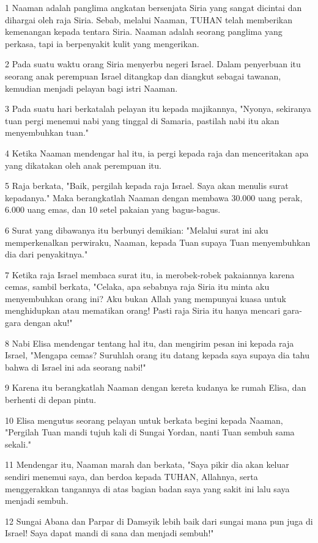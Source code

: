 \par 1 Naaman adalah panglima angkatan bersenjata Siria yang sangat dicintai dan dihargai oleh raja Siria. Sebab, melalui Naaman, TUHAN telah memberikan kemenangan kepada tentara Siria. Naaman adalah seorang panglima yang perkasa, tapi ia berpenyakit kulit yang mengerikan.
\par 2 Pada suatu waktu orang Siria menyerbu negeri Israel. Dalam penyerbuan itu seorang anak perempuan Israel ditangkap dan diangkut sebagai tawanan, kemudian menjadi pelayan bagi istri Naaman.
\par 3 Pada suatu hari berkatalah pelayan itu kepada majikannya, "Nyonya, sekiranya tuan pergi menemui nabi yang tinggal di Samaria, pastilah nabi itu akan menyembuhkan tuan."
\par 4 Ketika Naaman mendengar hal itu, ia pergi kepada raja dan menceritakan apa yang dikatakan oleh anak perempuan itu.
\par 5 Raja berkata, "Baik, pergilah kepada raja Israel. Saya akan menulis surat kepadanya." Maka berangkatlah Naaman dengan membawa 30.000 uang perak, 6.000 uang emas, dan 10 setel pakaian yang bagus-bagus.
\par 6 Surat yang dibawanya itu berbunyi demikian: "Melalui surat ini aku memperkenalkan perwiraku, Naaman, kepada Tuan supaya Tuan menyembuhkan dia dari penyakitnya."
\par 7 Ketika raja Israel membaca surat itu, ia merobek-robek pakaiannya karena cemas, sambil berkata, "Celaka, apa sebabnya raja Siria itu minta aku menyembuhkan orang ini? Aku bukan Allah yang mempunyai kuasa untuk menghidupkan atau mematikan orang! Pasti raja Siria itu hanya mencari gara-gara dengan aku!"
\par 8 Nabi Elisa mendengar tentang hal itu, dan mengirim pesan ini kepada raja Israel, "Mengapa cemas? Suruhlah orang itu datang kepada saya supaya dia tahu bahwa di Israel ini ada seorang nabi!"
\par 9 Karena itu berangkatlah Naaman dengan kereta kudanya ke rumah Elisa, dan berhenti di depan pintu.
\par 10 Elisa mengutus seorang pelayan untuk berkata begini kepada Naaman, "Pergilah Tuan mandi tujuh kali di Sungai Yordan, nanti Tuan sembuh sama sekali."
\par 11 Mendengar itu, Naaman marah dan berkata, "Saya pikir dia akan keluar sendiri menemui saya, dan berdoa kepada TUHAN, Allahnya, serta menggerakkan tangannya di atas bagian badan saya yang sakit ini lalu saya menjadi sembuh.
\par 12 Sungai Abana dan Parpar di Damsyik lebih baik dari sungai mana pun juga di Israel! Saya dapat mandi di sana dan menjadi sembuh!"
